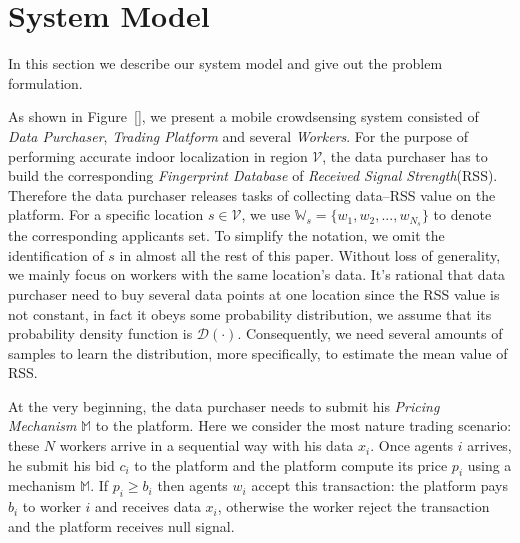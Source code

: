 \documentclass[10pt,conference,compsocconf,letterpaper]{IEEEtran}
\begin{document}
\section{System Model}\label{sysmodel}
In this section we describe our system model and give out the problem formulation.

As shown in Figure~\ref{}, we present a mobile crowdsensing system consisted of \emph{Data Purchaser}, \emph{Trading Platform} and several \emph{Workers}. For the purpose of performing accurate indoor localization in region $\mathcal{V}$, the data purchaser has to build the corresponding \emph{Fingerprint Database} of \emph{Received Signal Strength}(RSS). Therefore the data purchaser releases tasks of collecting data--RSS value on the platform. For a specific location $s\in \mathcal{V}$, we use $\mathds{W}_s=\{w_1,w_2,...,w_{N_s}\}$ to denote the corresponding applicants set. To simplify the notation, we omit the identification of $s$ in almost all the rest of this paper. Without loss of generality, we mainly focus on workers with the same location's data. It's rational that data purchaser need to buy several data points at one location since the RSS value is not constant, in fact it obeys some probability distribution, we assume that its probability density function is $\mathcal{D}(\cdot)$. Consequently, we need several amounts of samples to learn the distribution, more specifically, to estimate the mean value of RSS.

At the very beginning, the data purchaser needs to submit his \emph{Pricing Mechanism} $\mathbb{M}$ to the platform. Here we consider the most nature trading scenario: these $N$ workers arrive in a sequential way with his data $x_i$. Once agents $i$ arrives, he submit his bid $c_i$ to the platform and the platform compute its price $p_i$ using a mechanism $\mathbb{M}$. If $p_i\geq b_i$ then agents $w_i$ accept this transaction: the platform pays $b_i$ to worker $i$ and receives data $x_i$, otherwise the worker reject the transaction and the platform receives null signal.

\begin{table}[h]
\caption{\textsc{Notations}} \label{tab:Notation}
\centering
{}
\end{table}
\end{document}
